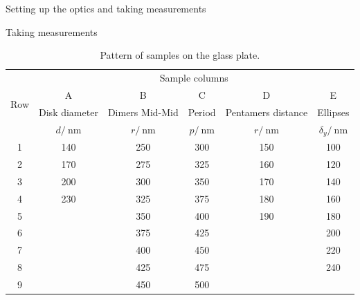 \documentclass[pdftex, a4paper,11pt, twoside, UKenglish]{report}
\begin{document}
\begin{chapter}{Setting up the optics and taking measurements}
\begin{section}{Taking measurements}
      \begin{table}[htbp]
        \centering
        \begin{tabular}{|c|c|c|c|c|c|}
          \hline
          \multirow{4}{*}{Row} & \multicolumn{5}{|c|}{Sample columns} 
          \\ \cline{2-6}
          & A & B & C & D & E \\
          & Disk diameter & Dimers Mid-Mid & Period & Pentamers distance
          & Ellipses  \\
          & $d /\SI{}{\nano\meter}$ & $r /\SI{}{\nano\meter}$
          & $p/\SI{}{\nano\meter}$ & $r /\SI{}{\nano\meter}$
          & $\delta_{y} /\SI{}{\nano\meter}$\\ \hline \hline
          1 & 140 & 250 & 300 & 150 & 100 \\ \hline 
          2 & 170 & 275 & 325 & 160 & 120 \\ \hline 
          3 & 200 & 300 & 350 & 170 & 140 \\ \hline 
          4 & 230 & 325 & 375 & 180 & 160 \\ \hline 
          5 &  & 350 & 400 & 190 & 180 \\ \hline 
          6 &  & 375 & 425 &  & 200 \\ \hline 
          7 &  & 400 & 450 &  & 220 \\ \hline 
          8 &  & 425 & 475 &  & 240 \\ \hline 
          9 &  & 450 & 500 &  &  \\ \hline 
        \end{tabular}
        \caption{Pattern of samples on the glass plate.}
        \label{tab:samplepattern}
      \end{table}
      
    \end{section}
    
  \end{chapter}
  
  
  
\end{document}
